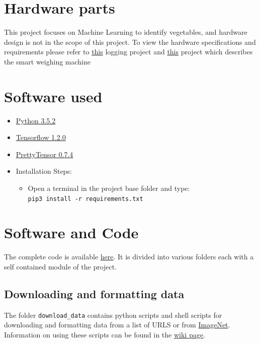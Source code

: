 \documentclass[a4paper,12pt,oneside]{book}
\begin{document}
\section{Hardware parts}
This project focuses on Machine Learning to identify vegetables, and hardware design is not in the scope of this project. To view the hardware specifications and requirements please refer to \href{https://github.com/eYSIP-2017/eYSIP-2017_Development_of_Web_Interface_for_GH_Farm_Produce}{this} logging project and \href{https://github.com/Ankurrpanwar26/eYSIP-2016-Farm-Produce-Logging-and-Monitoring}{this} project which describes the smart weighing machine


\newpage
\section{Software used}
\begin{itemize}
  \item \href{https://www.python.org/downloads/release/python-352/}{Python 3.5.2}
  \item \href{https://pypi.python.org/pypi/tensorflow/1.2.0}{Tensorflow 1.2.0}
  \item \href{https://github.com/google/prettytensor}{PrettyTensor 0.7.4} 
  \item Installation Steps:
  \begin{itemize}
  	\item Open a terminal in the project base folder and type: \\
  	\texttt{pip3 install -r requirements.txt}
  \end{itemize}
\end{itemize}


\section{Software and Code}
The complete code is available \href{https://github.com/eYSIP-2017/eYSIP-2017_Vegetable-Identification-Using-Transfer-Learning}{here}. It is divided into various folders each with a self contained module of the project.

\subsection{Downloading and formatting data}
The folder \texttt{download\_data} contains python scripts and shell scripts for downloading and formatting data from a list of URLS or from \href{http://www.image-net.org/}{ImageNet}. Information on using these scripts can be found in the \href{https://github.com/eYSIP-2017/eYSIP-2017_Vegetable-Identification-Using-Transfer-Learning/wiki/Downloading-and-formatting-data.}{wiki page}.
\end{document}
